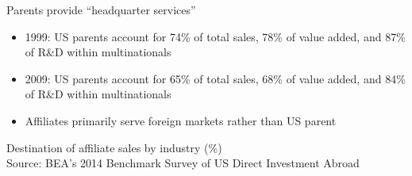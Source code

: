 \documentclass[11pt,notes=hide,aspectratio=169]{beamer}
\begin{document}
\begin{frame}{Parents provide ``headquarter services''}
\begin{itemize}
	\item 1999: US parents account for 74\% of total sales, 78\% of value added, and 87\% of R\&D within multinationals
	\item 2009: US parents account for 65\% of total sales, 68\% of value added, and 84\% of R\&D within multinationals
	\item Affiliates primarily serve foreign markets rather than US parent
\end{itemize}
\begin{center}
Destination of affiliate sales by industry (\%)
\\
{\scriptsize Source: BEA's 2014 Benchmark Survey of US Direct Investment Abroad}
\end{center}
\end{frame}
\end{document}
